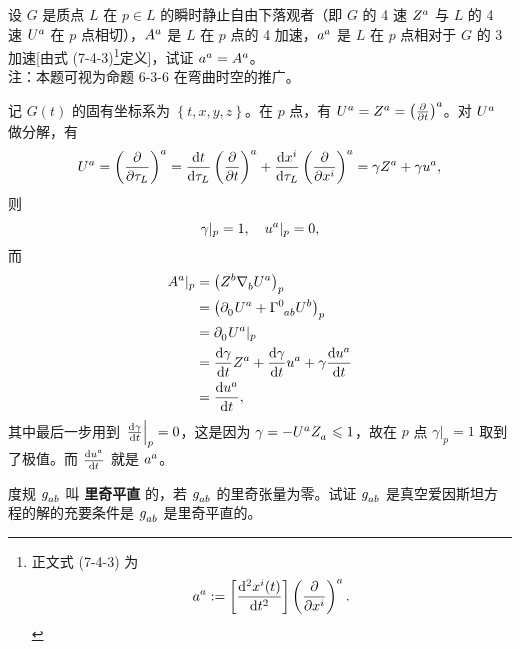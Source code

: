 \begin{xiti}
	\item 设 $G$ 是质点 $L$ 在 $p\in L$ 的瞬时静止自由下落观者（即 $G$ 的 4 速 $\tensor{Z}{^a}$ 与 $L$ 的 4 速 $\tensor{U}{^a}$ 在 $p$ 点相切），$\tensor{A}{^a}	$ 是 $L$ 在 $p$ 点的 4 加速，$\tensor{a}{^a}	$ 是 $L$ 在 $p$ 点相对于 $G$ 的 3 加速[由式 (7-4-3)\footnote{正文式 (7-4-3) 为
	\begin{equation*}
		\tensor{a}{^a} := \left[ \dv[2]{x^i(t)}{t} \right] \tensor{\left( \pdv{x^i} \right)}{^a}.
	\end{equation*}}定义]，试证 $\tensor{a}{^a} = \tensor{A}{^a}$。\\
	注：本题可视为命题 6-3-6 在弯曲时空的推广。

		\begin{zm}
			记 $G(t)$ 的固有坐标系为 $\left\{ t,x,y,z \right\}$。在 $p$ 点，有 $\tensor{U}{^a} = \tensor{Z}{^a} = \tensor{\left( \pdv{t} \right)}{^a}$。对 $\tensor{U}{^a}$ 做分解，有
			\begin{equation*}
				\tensor{U}{^a} = \tensor{\left( \pdv{\tau_L} \right)}{^a} = \dv{t}{\tau_L} \tensor{\left( \pdv{t} \right)}{^a} + \dv{x^i}{\tau_L} \tensor{\left( \pdv{x^i} \right)}{^a} = \gamma \tensor{Z}{^a} + \gamma \tensor{u}{^a},
			\end{equation*}
			则
			\begin{equation*}
				\gamma|_p = 1 \qc \tensor{u}{^a}|_{p} = 0,
			\end{equation*}
			而
			\begin{equation*}
				\begin{split}
					\tensor{A}{^a}|_p &= \left( \tensor{Z}{^b} \Nabla{b} \tensor{U}{^a} \right)_p\\
					&= \left( \Partial{0} \tensor{U}{^a} + \ChristoffelSymbol{0}{a}{b} \tensor{U}{^b} \right)_p\\
					&= \Partial{0} \tensor{U}{^a} |_p\\
					&= \dv{\gamma}{t} \tensor{Z}{^a} + \dv{\gamma}{t} \tensor{u}{^a} + \gamma \dv{\tensor{u}{^a}}{t}\\
					&= \dv{\tensor{u}{^a}}{t},
				\end{split}
			\end{equation*}
			其中最后一步用到 $\left.\dv{\gamma}{t}\right|_p = 0$，这是因为 $\gamma = - \tensor{U}{^a} \tensor{Z}{_a} \leqslant 1$，故在 $p$ 点 $\gamma|_p=1$ 取到了极值。而 $\dv{\tensor{u}{^a}}{t}$ 就是 $\tensor{a}{^a}$。
		\end{zm}

	\item 度规 $\tensor{g}{_a_b}$ 叫 \textbf{里奇平直} 的，若 $\tensor{g}{_a_b}$ 的里奇张量为零。试证 $\tensor{g}{_a_b}$ 是真空爱因斯坦方程的解的充要条件是 $\tensor{g}{_a_b}$ 是里奇平直的。


\end{xiti}
